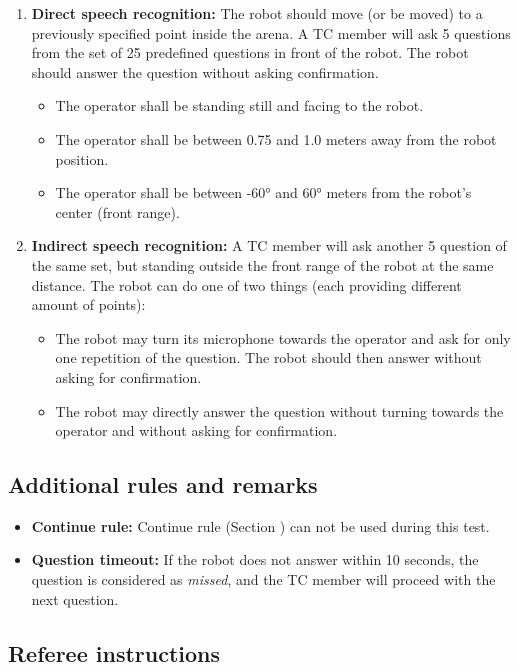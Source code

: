 \begin{enumerate}
\item \textbf{Direct speech recognition: } The robot should move (or be moved) to a previously specified point inside the arena. A TC member will ask 5 questions from the set of 25 predefined questions in front of the robot. The robot should answer the question without asking confirmation.
\begin{itemize}
\item The operator shall be standing still and facing to the robot.
\item The operator shall be between 0.75 and 1.0 meters away from the robot position.
\item The operator shall be between -60° and 60° meters from the robot's center (front range).
\end{itemize}
\item \textbf{Indirect speech recognition: } A TC member will ask another 5 question of the same set, but standing outside the front range of the robot at the same distance. The robot can do one of two things (each providing different amount of points):
\begin{itemize}
\item The robot may turn its microphone towards the operator and ask for only one repetition of the question. The robot should then answer without asking for confirmation.
\item The robot may directly answer the question without turning towards the operator and without asking for confirmation.
\end{itemize}
\end{enumerate}


\subsection{Additional rules and remarks}

\begin{itemize}
\item \textbf{Continue rule:} Continue rule (Section ) can not be used during this test.
\item \textbf{Question timeout:} If the robot does not answer within 10 seconds, the question is considered as \textit{missed}, and the TC member will proceed with the next question.
\end{itemize}

\subsection{Referee instructions}

